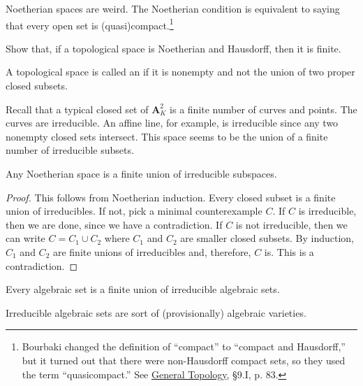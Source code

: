 \documentclass [11 pt, oneside] {article}
\begin{document}
Noetherian spaces are weird. The Noetherian condition is equivalent to saying that every open set is (quasi)compact.\footnote{Bourbaki changed the definition of ``compact'' to ``compact and Hausdorff,'' but it turned out that there were non-Hausdorff compact sets, so they used the term ``quasicompact.'' {See \ul{General Topology}, \S 9.I, p. 83.}}

\begin{exercise}\label{}
Show that, if a topological space is Noetherian and Hausdorff, then it is finite.
\end{exercise}

\begin{definition}[ ]\label{}
A topological space is called an  if it is nonempty and not the union of two proper closed subsets.
\end{definition}

Recall that a typical closed set of $\mathbf{A}^2_K$ is a finite number of curves and points. The curves are irreducible. An affine line, for example, is irreducible since any two nonempty closed sets intersect. This space seems to be the union of a finite number of irreducible subsets.

\begin{theorem}[ ]\label{}\index{}
Any Noetherian space is a finite union of irreducible subspaces.
\end{theorem}

\begin{proof}
This follows from Noetherian induction. Every closed subset is a finite union of irreducibles. If not, pick a minimal counterexample $C$. If $C$ is irreducible, then we are done, since we have a contradiction. If $C$ is not irreducible, then we can write $C=C_1\cup C_2$ where $C_1$ and $C_2$ are smaller closed subsets. By induction, $C_1$ and $C_2$ are finite unions of irreducibles and, therefore, $C$ is. This is a contradiction. 
\end{proof}

\begin{corollary}[ ]\label{}
Every algebraic set is a finite union of irreducible algebraic sets.
\end{corollary}

\begin{remark}
	Irreducible algebraic sets are sort of (provisionally) algebraic varieties.
\end{remark}
\end{document}
